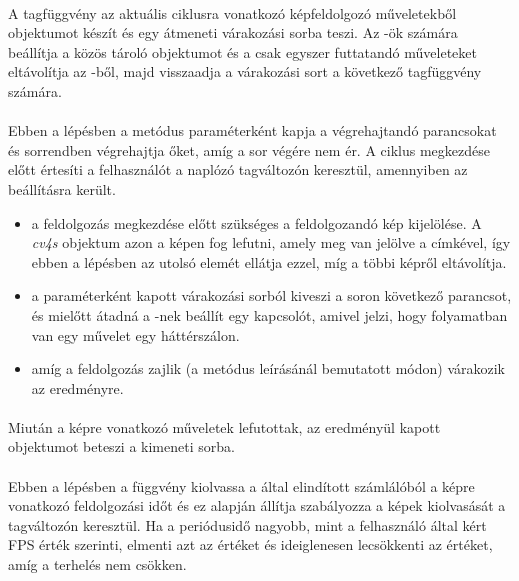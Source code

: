 \paragraph{} A tagfüggvény az aktuális ciklusra vonatkozó képfeldolgozó műveletekből  objektumot készít és egy átmeneti várakozási sorba teszi. Az -ök számára beállítja a közös tároló objektumot és a csak egyszer futtatandó műveleteket eltávolítja az -ből, majd visszaadja a várakozási sort a következő tagfüggvény számára.
\paragraph{} Ebben a lépésben a metódus paraméterként kapja a végrehajtandó parancsokat és sorrendben végrehajtja őket, amíg a sor végére nem ér. A ciklus megkezdése előtt értesíti a felhasználót a naplózó tagváltozón keresztül, amennyiben az beállításra került. 
\begin{itemize}
	\item {} a feldolgozás megkezdése előtt szükséges a feldolgozandó kép kijelölése. A \emph{cv4s}  objektum azon a képen fog lefutni, amely meg van jelölve a  címkével, így ebben a lépésben az  utolsó elemét ellátja ezzel, míg a többi képről eltávolítja.
	\item {} a paraméterként kapott várakozási sorból kiveszi a soron következő parancsot, és mielőtt átadná a -nek beállít egy kapcsolót, amivel jelzi, hogy folyamatban van egy művelet egy háttérszálon.
	\item {} amíg a feldolgozás zajlik (a  metódus leírásánál bemutatott módon) várakozik az eredményre.
\end{itemize}
\paragraph{} Miután a képre vonatkozó műveletek lefutottak, az eredményül kapott  objektumot beteszi a kimeneti sorba.
\paragraph{} Ebben a lépésben a függvény kiolvassa a  által elindított számlálóból a képre vonatkozó feldolgozási időt és ez alapján állítja szabályozza a képek kiolvasását a  tagváltozón keresztül. Ha a periódusidő nagyobb, mint a felhasználó által kért FPS érték szerinti, elmenti azt az értéket és ideiglenesen lecsökkenti az értéket, amíg a terhelés nem csökken. 

